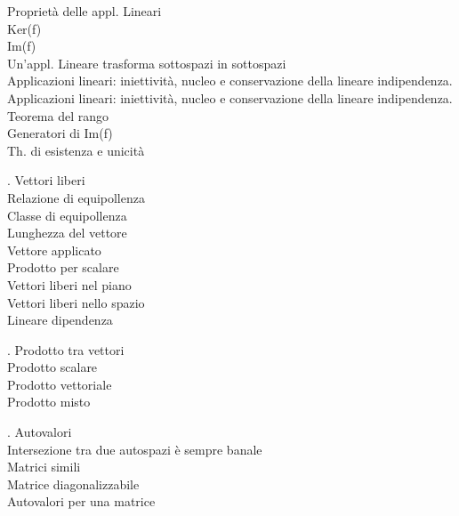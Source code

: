 \documentclass[11pt,a4paper]{article}
\begin{document}
\begin{flushleft}
\textbullet{}   Proprietà delle appl. Lineari\\
\textbullet{}   Ker(f)\\
\textbullet{}   Im(f)\\
\textbullet{}   Un’appl. Lineare trasforma sottospazi in sottospazi\\
Applicazioni lineari: iniettività, nucleo e conservazione della lineare indipendenza.\\
Applicazioni lineari: iniettività, nucleo e conservazione della lineare indipendenza.\\
\textbullet{}   Teorema del rango\\
\textbullet{}   Generatori di Im(f)\\
\textbullet{}   Th. di esistenza e unicità\\
\par\smallskip
\par{}. Vettori liberi\\
\textbullet{}   Relazione di equipollenza\\
\textbullet{}   Classe di equipollenza\\
\textbullet{}   Lunghezza del vettore\\
\textbullet{}   Vettore applicato\\
\textbullet{}   Prodotto per scalare\\
\textbullet{}   Vettori liberi nel piano\\
\textbullet{}   Vettori liberi nello spazio\\
\textbullet{}   Lineare dipendenza\\
\par\smallskip
\par{}. Prodotto tra vettori\\
\textbullet{}   Prodotto scalare\\
\textbullet{}   Prodotto vettoriale\\
\textbullet{}   Prodotto misto\\
\par\smallskip
\par{}. Autovalori\\
\textbullet{}   Intersezione tra due autospazi è sempre banale\\
\textbullet{}   Matrici simili\\
\textbullet{}   Matrice diagonalizzabile\\
\textbullet{}   Autovalori per una matrice\\

\end{flushleft}
\end{document}
